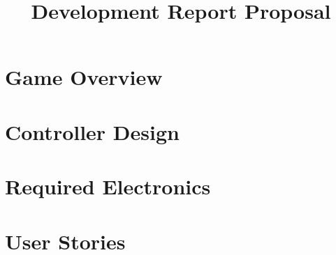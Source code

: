 \documentclass{article}
\begin{document}
\title{Development Report Proposal}
\date{}
\maketitle

\section{Game Overview}

\section{Controller Design}

\section{Required Electronics}

\section{User Stories}
\end{document}
